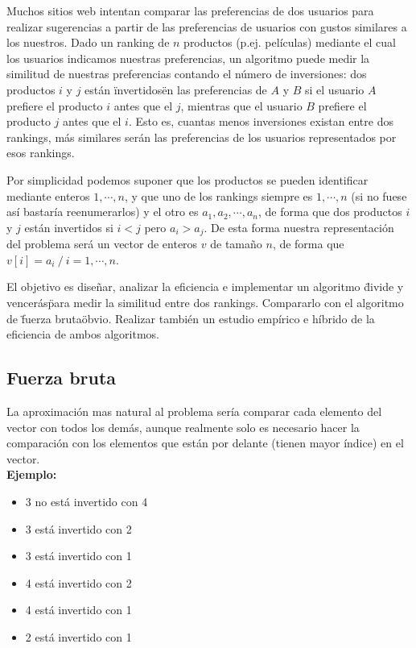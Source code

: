 
Muchos sitios web intentan comparar las preferencias de dos usuarios para realizar sugerencias a partir de las preferencias de usuarios con gustos similares a los nuestros. Dado un ranking de $n$ productos (p.ej. pel\'iculas) mediante el cual los usuarios indicamos nuestras preferencias, un algoritmo puede medir la similitud de nuestras preferencias contando el n\'umero de inversiones: dos productos $i$ y $j$ est\'an \"invertidos\" en las preferencias de $A$ y $B$ si el usuario $A$ prefiere el producto $i$ antes que el $j$, mientras que el usuario $B$ prefiere el producto $j$ antes que el $i$. Esto es, cuantas menos inversiones existan entre dos rankings, m\'as similares ser\'an las
preferencias de los usuarios representados por esos rankings.

Por simplicidad podemos suponer que los productos se pueden identificar mediante enteros
$1, \cdots, n$, y que uno de los rankings siempre es $1,\cdots, n$ (si no fuese as\'i bastar\'ia reenumerarlos) y el otro es $a_1, a_2, \cdots, a_n$, de forma que dos productos $i$ y $j$ est\'an invertidos si $i < j$ pero $a_i > a_j$.
De esta forma nuestra representaci\'on del problema ser\'a un vector de enteros $v$ de tamaño $n$, de forma que $v[i] = a_i\ / \ i = 1, \cdots, n$.

El objetivo es diseñar, analizar la eficiencia e implementar un algoritmo \"divide y vencer\'as\" para medir la similitud entre dos rankings. Compararlo con el algoritmo de \"fuerza bruta\" obvio. Realizar tambi\'en un estudio emp\'irico e h\'ibrido de la eficiencia de ambos algoritmos.

\newpage
\subsection{Fuerza bruta}
La aproximación mas natural al problema sería comparar cada elemento del vector con todos los demás, aunque realmente solo es necesario hacer la comparación con los elementos que están por delante (tienen mayor índice) en el vector.\\

\textbf{Ejemplo:}

\begin{center}
\end{center}

\begin{itemize}
\item 3 no está invertido con 4
\item 3 está invertido con 2
\item 3 está invertido con 1
\item 4 está invertido con 2
\item 4 está invertido con 1
\item 2 está invertido con 1
\end{itemize}

